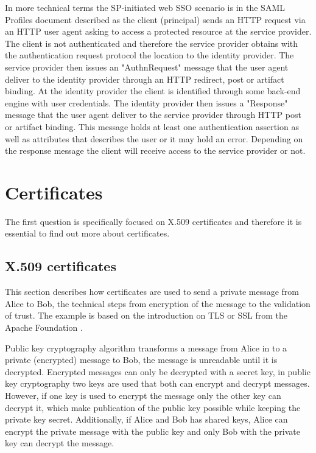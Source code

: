 In more technical terms the SP-initiated web SSO scenario is in the SAML Profiles document \cite[p.~15]{pdf:oasis-open-profiles} described as the client (principal) sends an HTTP request via an HTTP user agent asking to access a protected resource at the service provider.
The client is not authenticated and therefore the service provider obtains with the authentication request protocol the location to the identity provider. The service provider then issues an "AuthnRequest" message that the user agent deliver to the identity provider through an HTTP redirect, post or artifact binding.
At the identity provider the client is identified through some back-end engine with user credentials.
The identity provider then issues a "Response" message that the user agent deliver to the service provider through HTTP post or artifact binding.
This message holds at least one authentication assertion as well as attributes that describes the user or it may hold an error.
Depending on the response message the client will receive access to the service provider or not.

\section{Certificates}
The first question is specifically focused on X.509 certificates and therefore it is essential to find out more about certificates.

\subsection{X.509 certificates}
This section describes how certificates are used to send a private message from Alice to Bob, the technical steps from encryption 
of the message to the validation of trust.
The example is based on the introduction on TLS or SSL from the Apache Foundation \cite{website:ssl_intro}.

Public key cryptography algorithm transforms a message from Alice in to a private (encrypted) message to Bob, 
the message is unreadable until it is decrypted. 
Encrypted messages can only be decrypted with a secret key, in public key cryptography two keys are used that both can encrypt and 
decrypt messages. 
However, if one key is used to encrypt the message only the other key can decrypt it, which make publication of the public key 
possible while keeping the private key secret. 
Additionally, if Alice and Bob has shared keys, Alice can encrypt the private message with the public key and only Bob 
with the private key can decrypt the message.

